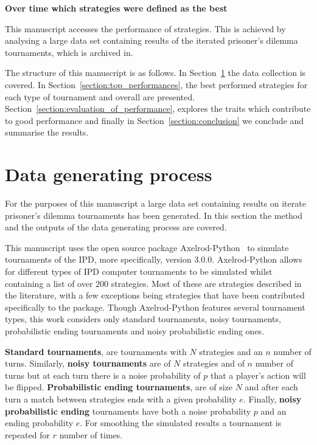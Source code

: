 \documentclass{article}
\begin{document}
\textbf{Over time which strategies were defined as the best}

This manuscript accesses the performance of strategies. This is achieved
by analysing a large data set containing results of the iterated prisoner's
dilemma tournaments, which is archived in.

The structure of this manuscript is as follows. In
Section~\ref{section:data_collection} the data collection is covered. In
Section~\ref{section:top_performances}, the best performed strategies for each
type of tournament and overall are presented.
Section~\ref{section:evaluation_of_performance}, explores the traits which
contribute to good performance and finally in Section~\ref{section:conclusion}
we conclude and summarise the results.


\section{Data generating process}\label{section:data_collection}

For the purposes of this manuscript a large data set containing results on
iterate prisoner's dilemma tournaments has been generated. In this section
the method and the outputs of the data generating process are covered.

This manuscript uses the open source package Axelrod-Python~\cite{axelrodproject}
to simulate tournaments of the IPD, more specifically, version 3.0.0.
Axelrod-Python allows for different types of IPD computer tournaments to be
simulated whilst containing a list of over 200 strategies. Most of these are
strategies described in the literature, with a few exceptions being strategies
that have been contributed specifically to the package. Though Axelrod-Python
features several tournament types, this work considers only standard tournaments,
noisy tournaments, probabilistic ending tournaments and noisy probabilistic
ending ones.

\textbf{Standard tournaments}, are tournaments with \(N\)
strategies and an \(n\) number of turns. Similarly, \textbf{noisy tournaments}
are of \(N\) strategies and of \(n\) number of turns but at each turn there is a
noise probability of \(p\) that a player's action will be flipped.
\textbf{Probabilistic ending tournaments}, are of size \(N\) and after each turn
a match between strategies ends with a given probability \(e\). Finally,
\textbf{noisy probabilistic ending} tournaments have both a noise probability
\(p\) and an ending probability \(e\). For smoothing the simulated results a
tournament is repeated for \(r\) number of times.
\end{document}

